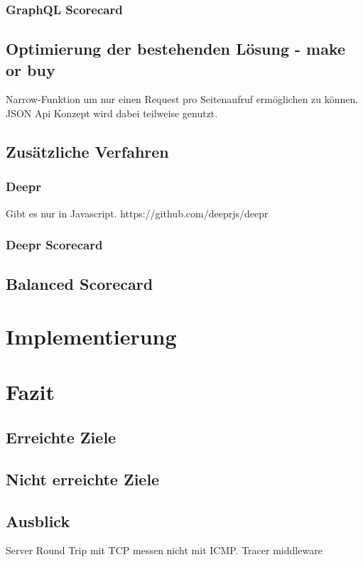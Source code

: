 \subsection{GraphQL Scorecard}
\section{Optimierung der bestehenden Lösung - make or buy}
Narrow-Funktion um nur einen Request pro Seitenaufruf ermöglichen zu können. JSON Api Konzept wird dabei teilweise genutzt.
\section{Zusätzliche Verfahren}
\subsection{Deepr}
Gibt es nur in Javascript.
https://github.com/deeprjs/deepr
\subsection{Deepr Scorecard}
\section{Balanced Scorecard}
\chapter{Implementierung}

\chapter{Fazit}
\section{Erreichte Ziele}
\section{Nicht erreichte Ziele}
\section{Ausblick}
Server Round Trip mit TCP messen nicht mit ICMP. Tracer middleware
